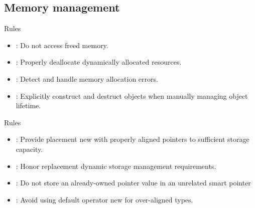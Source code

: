 \subsection{Memory management}

\begin{frame}[t]{Rules}
\begin{itemize}
  \item {}: 
        Do not access freed memory.
  \vfill
  \item {}: 
        Properly deallocate dynamically allocated resources.
  \vfill
  \item {}: 
        Detect and handle memory allocation errors.
  \vfill
  \item {}: 
        Explicitly construct and destruct objects when manually managing object lifetime.
  \vfill
\end{itemize}
\end{frame}

\begin{frame}[t]{Rules}
\begin{itemize}
  \item {}: 
        Provide placement new with properly aligned pointers to sufficient storage capacity.
  \vfill
  \item {}: 
        Honor replacement dynamic storage management requirements.
  \vfill
  \item {}: 
        Do not store an already-owned pointer value in an unrelated smart pointer
  \vfill
  \item {}: 
        Avoid using default operator new for over-aligned types.
\end{itemize}
\end{frame}


